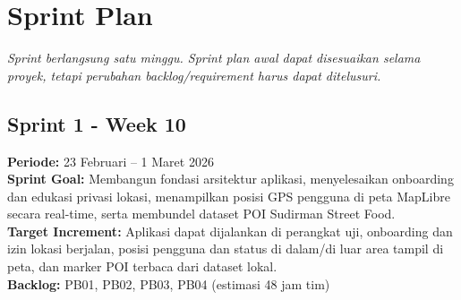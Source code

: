 \chapter{Sprint Plan}
\label{bab:sprint-plan}
\textit{Sprint berlangsung satu minggu. Sprint plan awal dapat disesuaikan selama proyek, tetapi perubahan backlog/requirement harus dapat ditelusuri.}

\newcommand{\sprinthead}{%
\cellcolor[HTML]{D9EAF7}\textbf{ID Task} & \cellcolor[HTML]{D9EAF7}\textbf{Rincian Task} & \cellcolor[HTML]{D9EAF7}\textbf{Est. (Jam)} & \cellcolor[HTML]{D9EAF7}\textbf{Backlog ID} & \cellcolor[HTML]{D9EAF7}\textbf{PIC} \\ \hline}
\newenvironment{sprinttable}[1]{%
\begin{longtable}{|L{0.11}|L{0.50}|L{0.09}|L{0.11}|L{0.19}|}
\caption{#1}\\
\hline
\sprinthead
\endfirsthead
\hline
\sprinthead
\endhead}{\end{longtable}}

\section*{Sprint 1 - Week 10}

\textbf{Periode:} 23 Februari -- 1 Maret 2026\\
\textbf{Sprint Goal:} Membangun fondasi arsitektur aplikasi, menyelesaikan onboarding dan edukasi privasi lokasi, menampilkan posisi GPS pengguna di peta MapLibre secara real-time, serta membundel dataset POI Sudirman Street Food.\\
\textbf{Target Increment:} Aplikasi dapat dijalankan di perangkat uji, onboarding dan izin lokasi berjalan, posisi pengguna dan status di dalam/di luar area tampil di peta, dan marker POI terbaca dari dataset lokal.\\
\textbf{Backlog:} PB01, PB02, PB03, PB04 (estimasi 48 jam tim)

